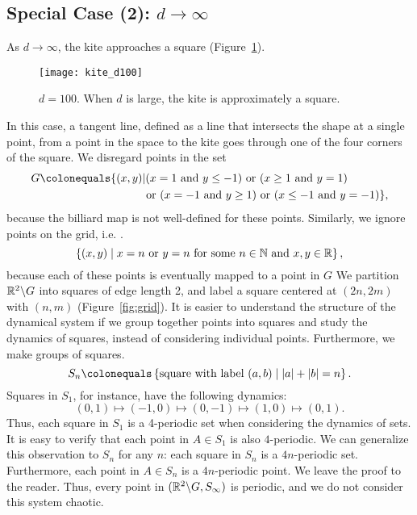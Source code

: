 \documentclass[10pt,twoside]{book}
\begin{document}
\subsection*{Special Case (2): $d \to \infty$}
As $d \to \infty$, the kite approaches a square (Figure~\ref{fig:kite-square}).
\begin{figure}[ht]
  \begin{center}
    \texttt{[image: kite\_d100]}
    \caption{$d = 100$. When $d$ is large, the kite is approximately a square.}
    \label{fig:kite-square}
  \end{center}
\end{figure}
In this case, a tangent line, defined as a line that intersects the shape at a single point, from a point in the space to the kite goes through one of the four corners of the square.
We disregard points in the set 
\begin{align*}
  G \ceq \{(x,y) &|
    (x = 1 \mbox{ and } y \leq -1) 
    \mbox{ or }
    (x \geq 1 \mbox{ and } y = 1)  \\
    &\mbox{ or }
    (x = -1 \mbox{ and } y \geq 1) 
    \mbox{ or }
    (x \leq -1 \mbox{ and } y = -1) 
  \},
\end{align*}
 because the billiard map is not well-defined for these points.
Similarly, we ignore points on the grid, i.e. .
\begin{equation*}
  \left \{ (x,y) \mathrel{} \middle| \mathrel{} x = n \mbox{ or } y = n \mbox{ for some } n \in \mathbb{N} \mbox{ and } x,y \in \mathbb{R} \right \},
\end{equation*}
because each of these points is eventually mapped to a point in $G$
We partition $\mathbb{R}^2 \backslash G$ into squares of edge length 2, and label a square centered at $(2n, 2m)$ with $(n,m)$ (Figure~\ref{fig:grid}).
It is easier to understand the structure of the dynamical system if we group together points into squares and study the dynamics of squares, instead of considering individual points.
Furthermore, we make groups of squares.
\begin{equation*}
  S_n \ceq \setst{\mbox{square with label } (a,b)}{\abs{a} + \abs{b} = n}.
\end{equation*}
Squares in $S_1$, for instance, have the following dynamics:
\begin{equation*}
  (0,1) \mapsto (-1,0) \mapsto (0,-1) \mapsto (1,0) \mapsto (0,1).
\end{equation*}
Thus, each square in $S_1$ is a 4-periodic set when considering the dynamics of sets.
It is easy to verify that each point in $A \in S_1$ is also $4$-periodic.
We can generalize this observation to $S_n$ for any $n$: each square in $S_n$ is a $4n$-periodic set.
Furthermore, each point in $A \in S_n$ is a $4n$-periodic point.
We leave the proof to the reader.
Thus, every point in $(\mathbb{R}^2 \backslash G, S_\infty)$ is periodic, and we do not consider this system chaotic.
\end{document}
